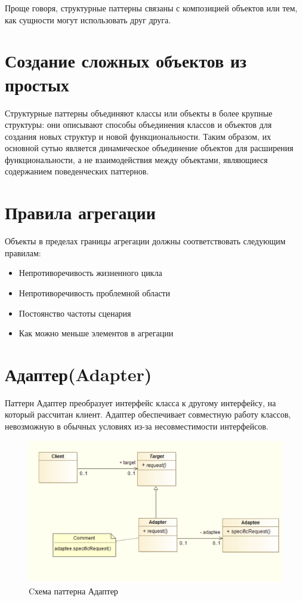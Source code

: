 Проще говоря, структурные паттерны связаны с композицией объектов или тем, как сущности могут использовать друг друга.

\section{Создание сложных объектов из простых}
Структурные паттерны объединяют классы или объекты в более крупные структуры: они описывают способы объединения классов и объектов для создания новых структур и новой функциональности. Таким образом, их основной сутью является динамическое объединение объектов для расширения функциональности, а не взаимодействия между объектами, являющиеся содержанием поведенческих паттернов.

\section{Правила агрегации}
Объекты в пределах границы агрегации должны соответствовать следующим правилам:
    \begin{itemize}
    \item Непротиворечивость жизненного цикла
    \item Непротиворечивость проблемной области
    \item Постоянство частоты сценария
    \item Как можно меньше элементов в агрегации
    \end{itemize}

\section{Адаптер(Adapter)}
Паттерн Адаптер преобразует интерфейс класса к другому интерфейсу, на который рассчитан клиент. Адаптер обеспечивает совместную работу классов, невозможную в обычных условиях из-за несовместимости интерфейсов.
\begin{figure}[!ht]
\begin{center}
\includegraphics[scale=0.7]{images/pic/pic27-1.png}\caption{Cхема паттерна Адаптер}\label{figure1}
\end{center}
\end{figure}

